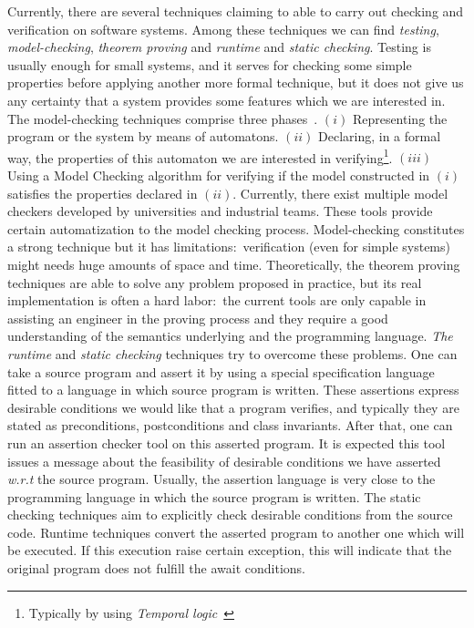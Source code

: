 \documentclass[a4paper]{llncs}
\newcommand{\ctl}{\textsc{Ctl}}
\newcommand{\pltl}{\textsc{Pltl}}
\begin{document}
Currently, there are several techniques claiming to able to carry out
checking and
verification on software systems. Among these techniques we can find
\textit{testing}, \textit{model-checking}, \textit{theorem
proving} and \textit{runtime} and \textit{static checking}. Testing
is usually enough
for small systems, and it serves for checking some simple properties
before applying another more formal technique, but it does not give
us any certainty that a system provides some features which we are
interested in. The model-checking techniques comprise three
phases~\cite{BBLPS99}. $(i)$ Representing the program or the system
by means of automatons. 
$(ii)$ Declaring, in a formal way, the properties of this automaton we are
interested in verifying\footnote{Typically by using
\textit{Temporal logic}~\cite{Pnue77}}. 
$(iii)$ Using a Model Checking algorithm for
verifying if the model constructed in $(i)$ satisfies the properties
declared in $(ii)$. Currently, there exist multiple model checkers
developed by universities and industrial teams. These tools provide certain
automatization to the model checking process. Model-checking
constitutes a strong technique
but it has limitations$:$ verification (even for simple systems) might
needs huge amounts of space and time. Theoretically, the
theorem proving techniques are able to solve any problem proposed in
practice, but its real implementation is often a
hard labor$:$ the current tools are only capable in assisting an
engineer in the proving process and they require a good understanding 
of the semantics underlying and the programming language. 
\textit{The runtime} and \textit{static checking} techniques try to
overcome
these problems. One can take a source program and
assert it by using a special specification language fitted to a
language in which source program is written. These assertions express
desirable conditions we would like that a program verifies, and
typically they are stated as
preconditions, postconditions and class invariants. After that, one
can run an assertion checker tool on this asserted program. It is
expected this tool issues a message about the feasibility of desirable
conditions we have asserted
\emph{w.r.t} the source program. Usually, the assertion language is 
very close to the programming language in which the source program is
written. The static checking techniques aim to explicitly check
desirable conditions from the source code. Runtime techniques
convert the asserted program to another one which will be executed. If 
this execution raise certain exception, this will indicate that the
original program does not fulfill the await conditions. 
\end{document}
